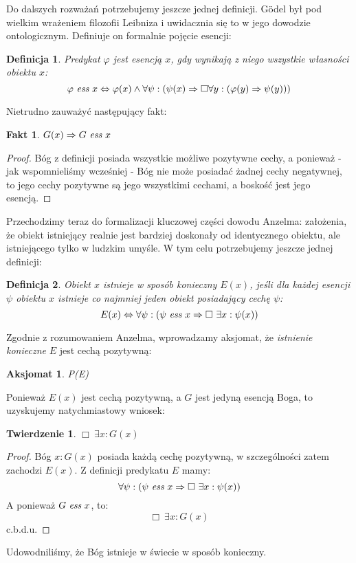 \documentclass{article}
\newtheorem{axiom-g}{Aksjomat}
\newtheorem{definition-g}{Definicja}
\newtheorem{theorem-g}{Twierdzenie}
\newtheorem{corollary}{Fakt}
\begin{document}
Do dalszych rozważań potrzebujemy jeszcze jednej definicji. Gödel był pod wielkim wrażeniem filozofii Leibniza i uwidacznia się to w jego dowodzie ontologicznym. Definiuje on formalnie pojęcie esencji:
\begin{definition-g}
	Predykat $\varphi$ jest \emph{esencją} $x$, gdy wynikają z niego wszystkie własności obiektu $x$:
	\begin{equation*}
	\varphi\ \emph{ess}\ x \Leftrightarrow \varphi(x) \wedge \forall \psi: \left( \psi(x) \Rightarrow \Box \forall y: \left( \varphi(y) \Rightarrow \psi(y) \right) \right)
	\end{equation*}
\end{definition-g}
Nietrudno zauważyć następujący fakt:
\begin{corollary}
	$G(x) \Rightarrow G\ \emph{ess}\ x$
\end{corollary}
\begin{proof}
	Bóg z definicji posiada wszystkie możliwe pozytywne cechy, a ponieważ - jak wspomnieliśmy wcześniej - Bóg nie może posiadać żadnej cechy negatywnej, to jego cechy pozytywne są jego wszystkimi cechami, a boskość jest jego esencją. 
\end{proof}
Przechodzimy teraz do formalizacji kluczowej części dowodu Anzelma: założenia, że obiekt istniejący realnie jest bardziej doskonały od identycznego obiektu, ale istniejącego tylko w ludzkim umyśle. W tym celu potrzebujemy jeszcze jednej definicji:
\begin{definition-g}
	Obiekt $x$ istnieje w sposób konieczny $E(x)$, jeśli dla każdej esencji $\psi$ obiektu $x$ istnieje co najmniej jeden obiekt posiadający cechę $\psi$:
	\begin{equation*}
	E(x) \Leftrightarrow \forall \psi: \left( \psi\ \emph{ess}\ x \Rightarrow\Box\ \exists x: \psi(x) \right)
	\end{equation*}
\end{definition-g}
Zgodnie z rozumowaniem Anzelma, wprowadzamy aksjomat, że \emph{istnienie konieczne} $E$ jest cechą pozytywną:
\begin{axiom-g}
	P(E)
\end{axiom-g}
Ponieważ $E(x)$ jest cechą pozytywną, a $G$ jest jedyną esencją Boga, to uzyskujemy natychmiastowy wniosek:
\begin{theorem-g}
	$\Box\ \exists x: G(x)$
\end{theorem-g}
\begin{proof}
	Bóg $x: G(x)$ posiada każdą cechę pozytywną, w szczególności zatem zachodzi $E(x)$. Z definicji predykatu $E$ mamy: 
	\begin{equation*}
	 \forall \psi: \left( \psi\ \emph{ess}\ x \Rightarrow\Box\ \exists x: \psi(x) \right)
	\end{equation*}
	A ponieważ $G\ \emph{ess}\ x$, to:
	\begin{equation*}
	\Box\ \exists x: G(x)
	\end{equation*}
	c.b.d.u.
\end{proof}
Udowodniliśmy, że Bóg istnieje w świecie w sposób konieczny. 
\end{document}
